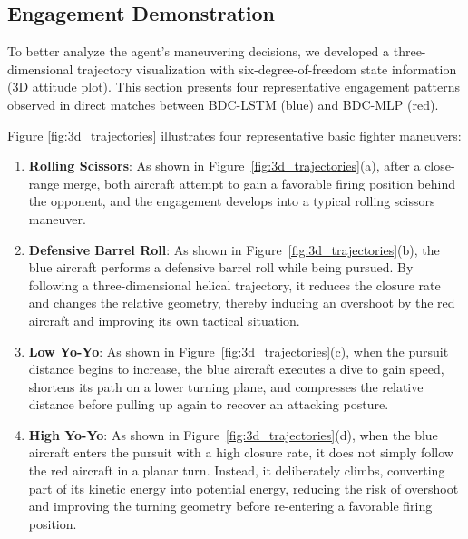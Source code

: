 \documentclass[pdflatex,sn-mathphys-num]{sn-jnl}%
\theoremstyle{thmstyleone}%
\theoremstyle{thmstyletwo}%
\theoremstyle{thmstylethree}%
\begin{document}


\subsection{Engagement Demonstration}
\label{sec:tactical_analysis}
To better analyze the agent's maneuvering decisions, we developed a three-dimensional trajectory visualization with six-degree-of-freedom state information (3D attitude plot). This section presents four representative engagement patterns observed in direct matches between BDC-LSTM (blue) and BDC-MLP (red).


Figure \ref{fig:3d_trajectories} illustrates four representative basic fighter maneuvers:
\begin{enumerate}
    \item \textbf{Rolling Scissors}: As shown in Figure~\ref{fig:3d_trajectories}(a), after a close-range merge, both aircraft attempt to gain a favorable firing position behind the opponent, and the engagement develops into a typical rolling scissors maneuver.
    
    \item \textbf{Defensive Barrel Roll}: As shown in Figure~\ref{fig:3d_trajectories}(b), the blue aircraft performs a defensive barrel roll while being pursued. By following a three-dimensional helical trajectory, it reduces the closure rate and changes the relative geometry, thereby inducing an overshoot by the red aircraft and improving its own tactical situation.
        
    \item \textbf{Low Yo-Yo}: As shown in Figure~\ref{fig:3d_trajectories}(c), when the pursuit distance begins to increase, the blue aircraft executes a dive to gain speed, shortens its path on a lower turning plane, and compresses the relative distance before pulling up again to recover an attacking posture.
    
    \item \textbf{High Yo-Yo}: As shown in Figure~\ref{fig:3d_trajectories}(d), when the blue aircraft enters the pursuit with a high closure rate, it does not simply follow the red aircraft in a planar turn. Instead, it deliberately climbs, converting part of its kinetic energy into potential energy, reducing the risk of overshoot and improving the turning geometry before re-entering a favorable firing position.
\end{enumerate}
\end{document}
